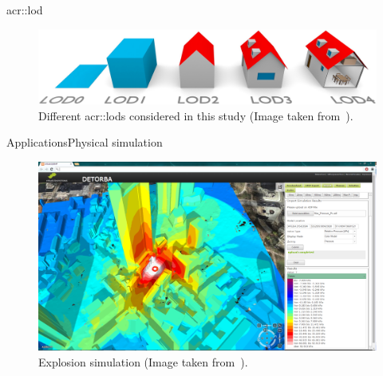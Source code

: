 \documentclass[10pt]{beamer}
\begin{document}
            \begin{frame}{\texorpdfstring{\acrfull*{acr::lod}}{Level of Detail}}
                \begin{figure}[H]
                    \centering
                    \includegraphics[width=\textwidth]{images/introduction/lods}
                    \caption{Different \glspl{acr::lod} considered in this study (Image taken from~\parencite{biljecki2016improved}).}
                \end{figure}
            \end{frame}

            \begin{frame}{Applications}{Physical simulation}
                \begin{figure}[H]
                    \centering
                    \includegraphics[width=.8\textwidth]{images/introduction/3d_model_applications/explosion_simulation}
                    \caption{Explosion simulation (Image taken from~\parencite{biljecki2015applications}).}
                \end{figure}
            \end{frame}
\end{document}
